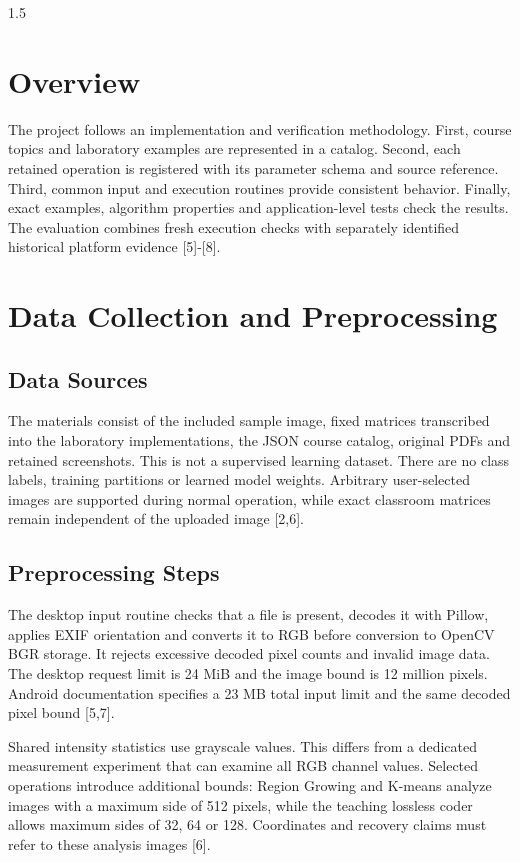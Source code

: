 \begin{spacing}{1.5}
\section{Overview}
The project follows an implementation and verification methodology. First, course topics and laboratory examples are represented in a catalog. Second, each retained operation is registered with its parameter schema and source reference. Third, common input and execution routines provide consistent behavior. Finally, exact examples, algorithm properties and application-level tests check the results. The evaluation combines fresh execution checks with separately identified historical platform evidence [5]-[8].

\section{Data Collection and Preprocessing}
\subsection{Data Sources}
The materials consist of the included sample image, fixed matrices transcribed into the laboratory implementations, the JSON course catalog, original PDFs and retained screenshots. This is not a supervised learning dataset. There are no class labels, training partitions or learned model weights. Arbitrary user-selected images are supported during normal operation, while exact classroom matrices remain independent of the uploaded image [2,6].

\subsection{Preprocessing Steps}
The desktop input routine checks that a file is present, decodes it with Pillow, applies EXIF orientation and converts it to RGB before conversion to OpenCV BGR storage. It rejects excessive decoded pixel counts and invalid image data. The desktop request limit is 24 MiB and the image bound is 12 million pixels. Android documentation specifies a 23 MB total input limit and the same decoded pixel bound [5,7].

Shared intensity statistics use grayscale values. This differs from a dedicated measurement experiment that can examine all RGB channel values. Selected operations introduce additional bounds: Region Growing and K-means analyze images with a maximum side of 512 pixels, while the teaching lossless coder allows maximum sides of 32, 64 or 128. Coordinates and recovery claims must refer to these analysis images [6].


\end{spacing}
